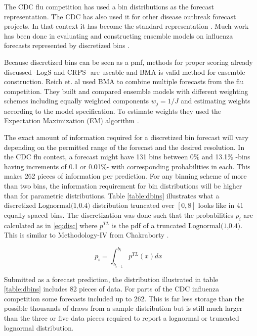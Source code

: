 \documentclass[11pt,notitlepage]{isuthesis}
\begin{document}
The CDC flu competition has used a bin distributions as the forecast 
representation. The CDC has also used it for other disease outbreak
forecast projects.
In that context it has become the standard representation 
\cite{brooks2020comparing}. Much work has been done in evaluating 
and constructing ensemble models on influenza forecasts represented by 
discretized bins \cite{mcgowan2019collaborative, mcandrew2019adaptively,reich2019collaborative}. 

Because discretized bins can be seen as a pmf, methods for proper scoring 
already 
discussed -LogS and CRPS- are useable and BMA is valid method for ensemble 
construction. Reich et. al used BMA to combine multiple forecasts from the flu 
competition. They built and compared ensemble models with different weighting
schemes including equally weighted components $w_j = 1/J$ and estimating weights
according to the model specification. To estimate weights they used the 
Expectation Maximization (EM) algorithm 
\cite[see
supplementary material within for details]{reich2019accuracy}.

The exact amount of information required for a discretized bin forecast will 
vary depending on the permitted range of the forecast and the desired 
resolution. 
In the CDC flu contest, a forecast might have 131 bins between 0\% and 13.1\% 
-bins having increments of 0.1 or 0.01\%- with 
corresponding probabilities in each. This makes 262 pieces of information per
prediction. For any binning scheme of more than two bins, the information 
requirement for bin distributions will be higher than for parametric 
distributions.
Table \ref{table:dbins} illustrates what a discretized 
$\mbox{Lognormal(1,0.4)}$ distribution truncated over $[0,8]$
looks like in 41 equally spaced bins. The discretization was done
such that the probabilities $p_i$ are calculated as in \eqref{eq:disc}
where $p^{TL}$ is the pdf of a truncated $\mbox{Lognormal(1,0.4)}$. This is 
similar
to Methodology-IV from Chakraborty 
\cite{chakraborty2015generating,kemp2004classes}.

\begin{equation}
\label{eq:disc}
  p_i = \int_{b_{i-1}}^{b_i} p^{TL}(x) dx
\end{equation}


Submitted as a forecast prediction, the distribution illustrated in table 
\ref{table:dbins} 
includes 82 pieces of data. For parts 
of the CDC influenza competition some forecasts included up to 262. This is 
far less storage than the possible thousands of draws from a sample 
distribution but is 
still much larger than the three or five data pieces required to report a 
lognormal
or truncated lognormal distribution.
\end{document}
